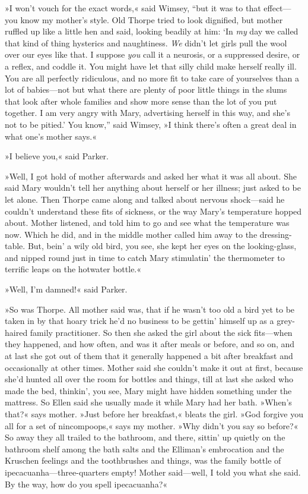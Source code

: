 »I won't vouch for the exact words,« said Wimsey, \enquote{but it was to that effect—you know my mother's style. Old Thorpe tried to look dignified, but mother ruffled up like a little hen and said, looking beadily at him: \enquote{In \textit{my} day we called that kind of thing hysterics and naughtiness. \textit{We} didn't let girls pull the wool over our eyes like that. I suppose \textit{you} call it a neurosis, or a suppressed desire, or a reflex, and coddle it. You might have let that silly child make herself really ill. You are all perfectly ridiculous, and no more fit to take care of yourselves than a lot of babies—not but what there are plenty of poor little things in the slums that look after whole families and show more sense than the lot of you put together. I am very angry with Mary, advertising herself in this way, and she's not to be pitied.} You know,} said Wimsey, »I think there's often a great deal in what one's mother says.«

»I believe you,« said Parker.

»Well, I got hold of mother afterwards and asked her what it was all about. She said Mary wouldn't tell her anything about herself or her illness; just asked to be let alone. Then Thorpe came along and talked about nervous shock—said he couldn't understand these fits of sickness, or the way Mary's temperature hopped about. Mother listened, and told him to go and see what the temperature was now. Which he did, and in the middle mother called him away to the dressing-table. But, bein' a wily old bird, you see, she kept her eyes on the looking-glass, and nipped round just in time to catch Mary stimulatin' the thermometer to terrific leaps on the hotwater bottle.«

»Well, I'm damned!« said Parker.

»So was Thorpe. All mother said was, that if he wasn't too old a bird yet to be taken in by that hoary trick he'd no business to be gettin' himself up as a grey-haired family practitioner. So then she asked the girl about the sick fits—when they happened, and how often, and was it after meals or before, and so on, and at last she got out of them that it generally happened a bit after breakfast and occasionally at other times. Mother said she couldn't make it out at first, because she'd hunted all over the room for bottles and things, till at last she asked who made the bed, thinkin', you see, Mary might have hidden something under the mattress. So Ellen said she usually made it while Mary had her bath. »When's that?« says mother. »Just before her breakfast,« bleats the girl. »God forgive you all for a set of nincompoops,« says my mother. »Why didn't you say so before?« So away they all trailed to the bathroom, and there, sittin' up quietly on the bathroom shelf among the bath salts and the Elliman's embrocation and the Kruschen feelings and the toothbrushes and things, was the family bottle of ipecacuanha—three-quarters empty! Mother said—well, I told you what she said. By the way, how do you spell ipecacuanha?«

